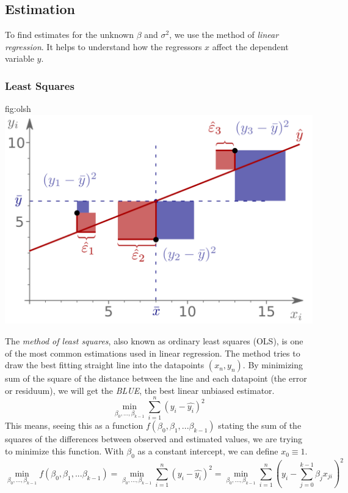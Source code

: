 \subsection{Estimation}
	To find estimates for the unknown $\beta$ and $\sigma^2$, we use the method of \emph{linear regression}. It helps to understand how the regressors $x$ affect the dependent variable $y$.	
	\subsubsection{Least Squares}\label{sec:ols}
		\begin{fig}{fig:ols}{h}
			\includegraphics[width=\textwidth]{P17ols.png}	
		\end{fig}	
		The \emph{method of least squares}, also known as ordinary least squares (OLS), is one of the most common estimations used in linear regression. The method tries to draw the best fitting straight line into the datapoints $(x_n,y_n)$. By minimizing sum of the square of the distance between the line and each datapoint (the error or residuum), we will get the \emph{BLUE}, the best linear unbiased estimator.
		\begin{equation*}
			\min_{\beta_0,...,\beta_{k-1}} \sum\limits_{i=1}^n \left(y_i-\hat{y_i}\right)^2
		\end{equation*}
		This means, seeing this as a function $f(\beta_0,\beta_1,...\beta_{k-1})$ stating the sum of the squares of the differences between observed and estimated values, we are trying to minimize this function. With $\beta_0$ as a constant intercept, we can define $x_0\equiv 1$.
		\begin{equation*}
		\min_{\beta_0,...,\beta_{k-1}} f(\beta_0,\beta_1,...\beta_{k-1}) = \min_{\beta_0,...,\beta_{k-1}} \sum\limits_{i=1}^n \left(y_i-\hat{y_i}\right)^2 = \min_{\beta_0,...,\beta_{k-1}}  \sum\limits_{i=1}^n \left(y_i-\sum\limits_{j=0}^{k-1}\beta_j x_{ji} \right)^2
		\end{equation*}
